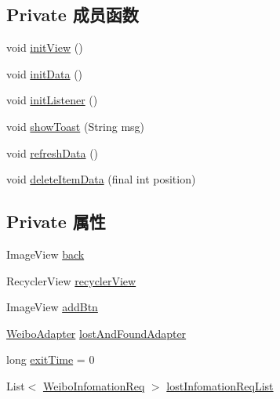 \subsection*{Private 成员函数}
\begin{DoxyCompactItemize}
\item 
void \mbox{\hyperlink{classcom_1_1example_1_1akisame__lin_1_1love__air2_1_1_weibo_activity_aea0e4bd788b676984e843958814aeacd}{init\+View}} ()
\item 
void \mbox{\hyperlink{classcom_1_1example_1_1akisame__lin_1_1love__air2_1_1_weibo_activity_a67438080f6e34247d5453b5b17c555e4}{init\+Data}} ()
\item 
void \mbox{\hyperlink{classcom_1_1example_1_1akisame__lin_1_1love__air2_1_1_weibo_activity_a56ba98e8b934571e4b1760e0a43a9301}{init\+Listener}} ()
\item 
void \mbox{\hyperlink{classcom_1_1example_1_1akisame__lin_1_1love__air2_1_1_weibo_activity_a41acb4283e6297c37f277ddbcc6df1d7}{show\+Toast}} (String msg)
\item 
void \mbox{\hyperlink{classcom_1_1example_1_1akisame__lin_1_1love__air2_1_1_weibo_activity_afb88af416cf7e006ae29accf0d14883a}{refresh\+Data}} ()
\item 
void \mbox{\hyperlink{classcom_1_1example_1_1akisame__lin_1_1love__air2_1_1_weibo_activity_afe805b177368c8db8c7b5834a6f0a56f}{delete\+Item\+Data}} (final int position)
\end{DoxyCompactItemize}
\subsection*{Private 属性}
\begin{DoxyCompactItemize}
\item 
Image\+View \mbox{\hyperlink{classcom_1_1example_1_1akisame__lin_1_1love__air2_1_1_weibo_activity_a51724135cd5dec160d6a81f0a39ea0fa}{back}}
\item 
Recycler\+View \mbox{\hyperlink{classcom_1_1example_1_1akisame__lin_1_1love__air2_1_1_weibo_activity_a16d87074e32512bccce734c8f6e76310}{recycler\+View}}
\item 
Image\+View \mbox{\hyperlink{classcom_1_1example_1_1akisame__lin_1_1love__air2_1_1_weibo_activity_a0f56f7558eedc0ffd5629bb87f6a62f2}{add\+Btn}}
\item 
\mbox{\hyperlink{classcom_1_1example_1_1akisame__lin_1_1love__air2_1_1adapter_1_1_weibo_adapter}{Weibo\+Adapter}} \mbox{\hyperlink{classcom_1_1example_1_1akisame__lin_1_1love__air2_1_1_weibo_activity_a45b0621a4fadfeba6f3de05bf1cf448c}{lost\+And\+Found\+Adapter}}
\item 
long \mbox{\hyperlink{classcom_1_1example_1_1akisame__lin_1_1love__air2_1_1_weibo_activity_a308b53434e718b64e6ef5121369ac2a3}{exit\+Time}} = 0
\item 
List$<$ \mbox{\hyperlink{classcom_1_1example_1_1akisame__lin_1_1love__air2_1_1bean1_1_1_weibo_infomation_req}{Weibo\+Infomation\+Req}} $>$ \mbox{\hyperlink{classcom_1_1example_1_1akisame__lin_1_1love__air2_1_1_weibo_activity_a1e0b6923af79a5e8000dc1f266d813e8}{lost\+Infomation\+Req\+List}}
\end{DoxyCompactItemize}
